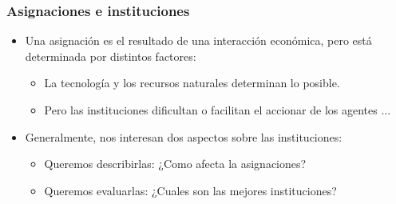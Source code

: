 \documentclass{beamer}
\begin{document}
\begin{frame}
\frametitle{Asignaciones e instituciones}
\begin{itemize}
    \item Una asignación es el resultado de una interacción económica, pero está determinada por distintos factores:\vspace{4mm}
    \begin{itemize}
        \item La tecnología y los recursos naturales determinan lo posible.\vspace{2mm}
        \item Pero las instituciones dificultan o facilitan el accionar de los agentes ...\vspace{4mm}
    \end{itemize}
    \item Generalmente, nos interesan dos aspectos sobre las instituciones:\vspace{4mm}
    \begin{itemize}
        \item Queremos describirlas: ¿Como afecta la asignaciones?\vspace{2mm} 
        \item Queremos evaluarlas: ¿Cuales son las mejores instituciones?
    \end{itemize}
\end{itemize} 
\end{frame}

\end{document}
